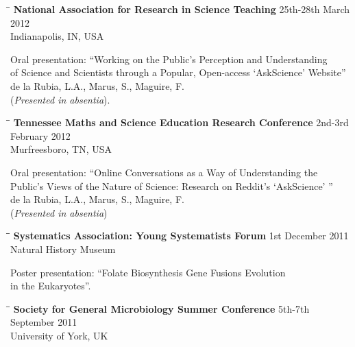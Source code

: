\documentclass{res}
\begin{document}
\begin{resume}
   \vspace{-0.1in}
   \begin{tabbing}
   \hspace{2in}\= \hspace{2.6in}\= \kill 
   {\bf National Association for Research in Science Teaching } \>  \> 25th-28th March 2012\\
                        \>     \> Indianapolis, IN, USA
   \end{tabbing}\vspace{-20pt}      
Oral presentation: ``Working on the Public's Perception and Understanding \\of Science and Scientists
through a Popular, Open-access `AskScience' Website'' \\
de la Rubia, L.A., Marus, S., Maguire, F. \\
(\emph{Presented in absentia}).
   
   
   \vspace{-0.1in}
    \begin{tabbing}
   \hspace{2in}\= \hspace{2.6in}\= \kill 
    {\bf Tennessee Maths and Science Education Research Conference} \>  \> 2nd-3rd February 2012\\
                        \>     \> Murfreesboro, TN, USA
   \end{tabbing}
   
  \vspace{-30pt}     
Oral presentation: ``Online Conversations as a Way of Understanding the \\Public's Views of the Nature of Science: Research on Reddit's `AskScience' '' 
 \\ de la Rubia, L.A., Marus, S., Maguire, F. \\
 (\emph{Presented in absentia})
  \vspace{-0.1in}
  
  \begin{tabbing}
   \hspace{2in}\= \hspace{2.6in}\= \kill 
    {\bf Systematics Association: Young Systematists Forum} \>  \> 1st December 2011\\
                        \>     \> Natural History Museum
   \end{tabbing}\vspace{-20pt}      
   
   Poster presentation: ``Folate Biosynthesis Gene Fusions Evolution \\in the Eukaryotes''.
    \vspace{-0.1in}  
    \begin{tabbing}
   \hspace{2in}\= \hspace{2.6in}\= \kill 
    {\bf Society for General Microbiology Summer Conference} \> \>5th-7th September 2011\\
                          \>   \> University of York, UK


\end{tabbing}
\end{resume}
\end{document}
